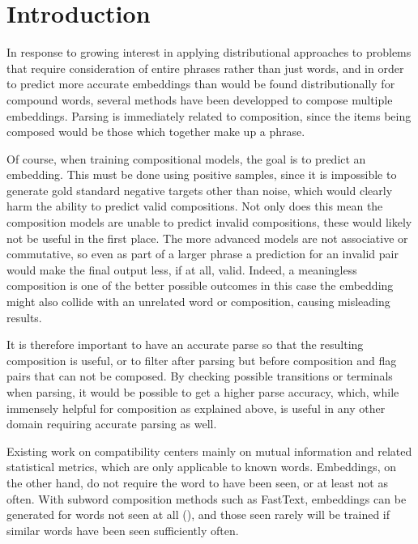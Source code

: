 \documentclass[a4paper, 12pt]{scrartcl}
\begin{document}


\section{Introduction}

In response to growing interest in applying distributional approaches to problems that require consideration of entire phrases rather than just words, and in order to predict more accurate embeddings than would be found distributionally for compound words, several methods have been developped to compose multiple embeddings. Parsing is immediately related to composition, since the items being composed would be those which together make up a phrase.

Of course, when training compositional models, the goal is to predict an embedding. This must be done using positive samples, since it is impossible to generate gold standard negative targets other than noise, which would clearly harm the ability to predict valid compositions. Not only does this mean the composition models are unable to predict invalid compositions, these would likely not be useful in the first place. The more advanced models are not associative or commutative, so even as part of a larger phrase a prediction for an invalid pair would make the final output less, if at all, valid. Indeed, a meaningless composition is one of the better possible outcomes in this case \textemdash the embedding might also collide with an unrelated word or composition, causing misleading results.

It is therefore important to have an accurate parse so that the resulting composition is useful, or to filter after parsing but before composition and flag pairs that can not be composed. By checking possible transitions or terminals when parsing, it would be possible to get a higher parse accuracy, which, while immensely helpful for composition as explained above, is useful in any other domain requiring accurate parsing as well.

Existing work on compatibility centers mainly on mutual information and related statistical metrics, which are only applicable to known words. Embeddings, on the other hand, do not require the word to have been seen, or at least not as often. With subword composition methods such as FastText, embeddings can be generated for words not seen at all (\cite{FastText}), and those seen rarely will be trained if similar words have been seen sufficiently often.
\end{document}
